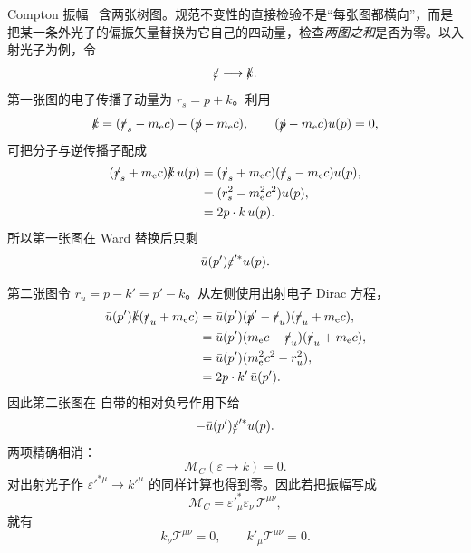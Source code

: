 
\begin{exbox}
Compton 振幅~ 含两张树图。规范不变性的直接检验不是“每张图都横向”，而是把某一条外光子的偏振矢量替换为它自己的四动量，检查\emph{两图之和}是否为零。以入射光子为例，令
\begin{equation*}
 \slashed\varepsilon\longrightarrow\slashed k.
\end{equation*}
第一张图的电子传播子动量为 $r_s=p+k$。利用
\begin{equation*}
 \slashed k
 =(\slashed r_s-m_{\mathrm e} c)-(\slashed p-m_{\mathrm e} c),
 \qquad
 (\slashed p-m_{\mathrm e} c)u(p)=0,
\end{equation*}
可把分子与逆传播子配成
\begin{align*}
 (\slashed r_s+m_{\mathrm e} c)\slashed k\,u(p)
 &=(\slashed r_s+m_{\mathrm e} c)(\slashed r_s-m_{\mathrm e} c)u(p),\\
 &=(r_s^2-m_{\mathrm e}^2c^2)u(p),\\
 &=2p\cdot k\,u(p).
\end{align*}
所以第一张图在 Ward 替换后只剩
\begin{equation*}
 \bar u(p')\slashed\varepsilon'^{*}u(p).
\end{equation*}

第二张图令 $r_u=p-k'=p'-k$。从左侧使用出射电子 Dirac 方程，
\begin{align*}
 \bar u(p')\slashed k(\slashed r_u+m_{\mathrm e} c)
 &=\bar u(p')(\slashed p'-\slashed r_u)(\slashed r_u+m_{\mathrm e} c),\\
 &=\bar u(p')(m_{\mathrm e} c-\slashed r_u)(\slashed r_u+m_{\mathrm e} c),\\
 &=\bar u(p')(m_{\mathrm e}^2c^2-r_u^2),\\
 &=2p\cdot k'\,\bar u(p').
\end{align*}
因此第二张图在 自带的相对负号作用下给
\begin{equation*}
 -\bar u(p')\slashed\varepsilon'^{*}u(p).
\end{equation*}
两项精确相消：
\begin{equation}
 \boxed{
 \mathcal M_C(\varepsilon\to k)=0.}
 \label{eq:compton-ward-incoming-dp64}
\end{equation}
对出射光子作 $\varepsilon'^{*\mu}\to k'^{\mu}$ 的同样计算也得到零。因此若把振幅写成
\begin{equation*}
 \mathcal M_C
 =\varepsilon'^{*}_{\mu}\varepsilon_\nu\,
 \mathcal T^{\mu\nu},
\end{equation*}
就有
\begin{equation}
 \boxed{
 k_\nu\mathcal T^{\mu\nu}=0,
 \qquad
 k'_\mu\mathcal T^{\mu\nu}=0.}
 \label{eq:compton-double-ward-dp64}
\end{equation}


\end{exbox}
